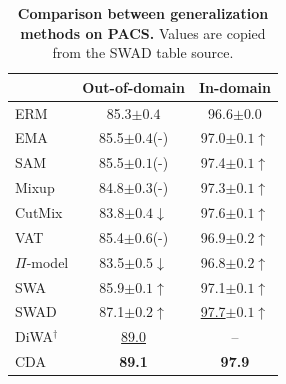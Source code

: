 \documentclass[10pt]{article}
\newcommand{\data}[1]{\textsc{#1}}
\newcommand{\greenp}[1]{{\color{teal!70!black}#1}}
\newcommand{\redp}[1]{{\color{red!70!black}#1}}
\begin{document}
\begin{table}
\vspace{-1.2em}
\caption{\small \textbf{Comparison between generalization methods on \data{PACS}.} Values are copied from the SWAD table source.}
\vspace{-0.4em}
\centering
\setlength{\tabcolsep}{3pt}
\begin{tabular}{@{}lcc@{}}
\toprule
                & \multicolumn{1}{l}{Out-of-domain} & \multicolumn{1}{l}{In-domain}  \\
\midrule
ERM             & 85.3\scriptsize{$\pm0.4$} & 96.6\scriptsize{$\pm0.0$}                      \\
EMA             & 85.5{\scriptsize$\pm0.4$}(-) & 97.0{\scriptsize$\pm0.1$}\greenp{$\uparrow$}                      \\
SAM             & 85.5{\scriptsize$\pm0.1$}(-) & 97.4{\scriptsize$\pm0.1$}\greenp{$\uparrow$}                     \\
Mixup           & 84.8{\scriptsize$\pm0.3$}(-) & 97.3{\scriptsize$\pm0.1$}\greenp{$\uparrow$}                      \\
CutMix          & 83.8{\scriptsize$\pm0.4$}\redp{$\downarrow$} & 97.6{\scriptsize$\pm0.1$}\greenp{$\uparrow$}                      \\
VAT             & 85.4{\scriptsize$\pm0.6$}(-)  & 96.9{\scriptsize$\pm0.2$}\greenp{$\uparrow$}                      \\
$\Pi$-model     & 83.5{\scriptsize$\pm0.5$}\redp{$\downarrow$}  & 96.8{\scriptsize$\pm0.2$}\greenp{$\uparrow$}                      \\
\midrule
SWA      & 85.9{\scriptsize$\pm0.1$}\greenp{$\uparrow$}        & 97.1{\scriptsize$\pm0.1$}\greenp{$\uparrow$}                      \\
SWAD     & 87.1{\scriptsize$\pm0.2$}\greenp{$\uparrow$}        & \underline{97.7}{\scriptsize$\pm0.1$}\greenp{$\uparrow$}                      \\
DiWA$^\dagger$ & \underline{89.0} & -- \\
CDA   & \textbf{89.1} & \textbf{97.9} \\
\bottomrule
\end{tabular}
\vspace{-0.5em}
\label{table:generalization_cda}
\end{table}
\end{document}
